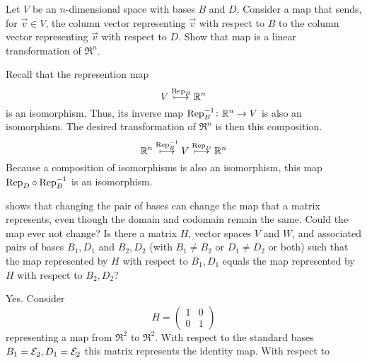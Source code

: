\begin{exercises}
\begin{answer}
    \end{answer}
  \recommended \item 
    Let \( V \) be an \( n \)-dimensional space with bases \( B \) and
    \( D \).
    Consider a map that sends, for \( \vec{v}\in V\), 
    the column vector representing \( \vec{v} \) with
    respect to \( B \) to the column vector representing \( \vec{v} \) with
    respect to \( D \).
    Show that map is a linear transformation of \( \Re^n \).
    \begin{answer}
      Recall that the represention map
      \begin{equation*}
        V\stackrel{\text{Rep}_{B}}{\longmapsto}\mathbb{R}^n
      \end{equation*}
      is an isomorphism.
      Thus, its inverse map $\mbox{$\mbox{Rep}_B^{-1}\colon \mathbb{R}^n\to V$}$
      is also an isomorphism.
      The desired transformation of $\Re^n$ is then this composition.
      \begin{equation*}
        \mathbb{R}^n\stackrel{\text{Rep}_{B}^{-1}}{\longmapsto}
        V\stackrel{\text{Rep}_{D}}{\longmapsto}\mathbb{R}^n
      \end{equation*}
      Because a composition of isomorphisms is also an isomorphism, 
      this map $\mbox{Rep}_{D}\mathbin\circ \mbox{Rep}_{B}^{-1}$
      is an isomorphism.
    \end{answer}
  \item 
     shows that changing the pair of
    bases can change the map that a matrix
    represents, even though the domain and codomain remain the same.
    Could the map ever not change?
    Is there a matrix \( H \), vector spaces \( V \) and \( W \), and
    associated pairs of bases \( B_1,D_1 \) and \( B_2,D_2 \) (with
    \( B_1\neq B_2 \) or \( D_1\neq D_2 \) or both) 
    such that the map represented
    by \( H \) with respect to \( B_1,D_1 \) equals the map represented
    by \( H \) with respect to \( B_2,D_2 \)?
    \begin{answer}
      Yes.
      Consider
      \begin{equation*}
        H=\begin{pmatrix}
            1  &0  \\
            0  &1
          \end{pmatrix}
      \end{equation*}
      representing a map from \( \Re^2 \) to \( \Re^2 \).
      With respect to the standard bases 
      \( B_1={\cal E}_2, D_1={\cal E}_2 \) this matrix
      represents the identity map.
      With respect to
      \begin{equation*}

\end{equation*}
\end{answer}
\end{exercises}
